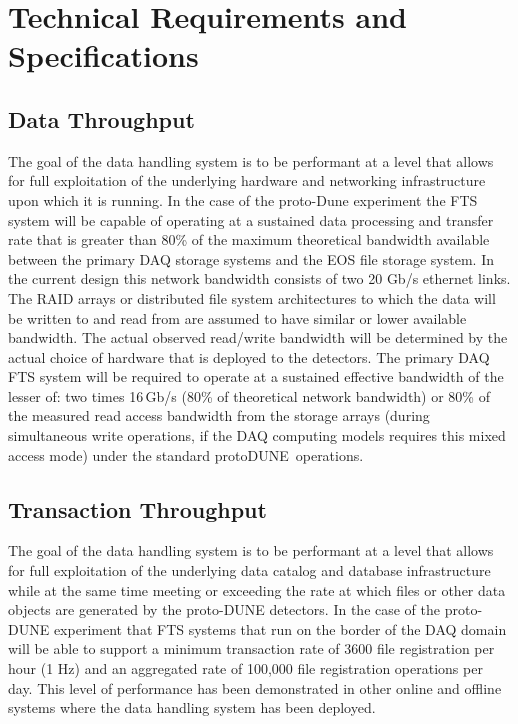 \documentclass[pdftex,12pt,letter]{article}
\newcommand{\pd}{protoDUNE\ }
\begin{document}
\section{Technical Requirements and Specifications}


\subsection{Data Throughput}

The goal of the data handling system is to be performant at a level that allows for full exploitation of the underlying hardware and networking infrastructure
upon which  it is running.  In the case of the proto-Dune experiment the FTS system will be capable of operating at a sustained data processing and transfer
rate that is greater than 80\% of the maximum theoretical bandwidth available between the primary DAQ storage systems and the EOS file storage system.
 In the current design this network bandwidth consists of two 20 Gb/s ethernet links.  The RAID arrays or distributed file system architectures to which the
data will be written to and read from are assumed to have similar or lower available bandwidth.  The actual observed read/write bandwidth will be determined
by the actual choice of hardware that is deployed to the detectors.  The primary DAQ FTS system will be required to operate at a sustained effective bandwidth
of the lesser of: two times 16\,Gb/s (80\% of theoretical network bandwidth) or 80\% of the measured read access bandwidth from the storage arrays
(during simultaneous write operations, if the DAQ computing models requires this mixed access mode) under the standard \pd operations.

\subsection{Transaction Throughput}

The goal of the data handling system is to be performant at a level that allows for full exploitation of the underlying data
catalog and database infrastructure while at the same time meeting or exceeding the rate at which files or other data
objects are generated by the proto-DUNE detectors.  In the case of the proto-DUNE experiment that FTS systems that run on
the border of the DAQ domain will be able to support a minimum transaction rate of 3600 file registration per hour (1 Hz)
and an aggregated rate of 100,000 file registration operations per day.  This level of performance has been demonstrated
in other online and offline systems where the data handling system has been deployed.
\end{document}
